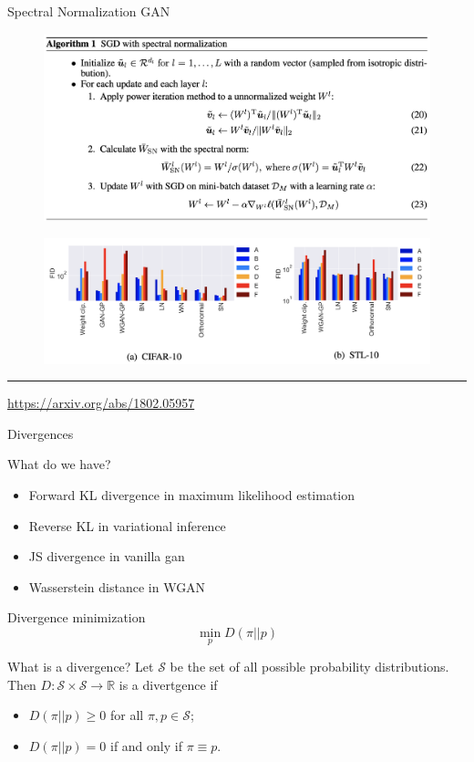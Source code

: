 \documentclass{beamer}
\newcommand{\bbR}{\mathbb{R}}
\newcommand{\cS}{\mathcal{S}}
\begin{document}
\begin{frame}{Spectral Normalization GAN}
	\begin{figure}
		\centering
		\includegraphics[width=0.85\linewidth]{figs/sngan_pseudocode}
	\end{figure}
	\begin{figure}
		\centering
		\includegraphics[width=0.85\linewidth]{figs/sngan_fids}
	\end{figure}
	\vfill
	\hrule\medskip 
	{\scriptsize \href{https://arxiv.org/abs/1802.05957}{https://arxiv.org/abs/1802.05957}}
\end{frame}
\begin{frame}{Divergences}
	\begin{block}{What do we have?}
		\begin{itemize}
			\item Forward KL divergence in maximum likelihood estimation
			\item Reverse KL in variational inference
			\item JS divergence in  vanilla gan
			\item Wasserstein distance in WGAN
		\end{itemize}
	\end{block}
	\begin{block}{Divergence minimization}
		\vspace{-0.3cm}
		\[
			\min_p D(\pi || p)
		\]
		\vspace{-0.5cm}
	\end{block}
	\begin{block}{What is a divergence?}
		Let $\cS$ be the set of all possible probability distributions. Then $D: \cS \times \cS \rightarrow \bbR$ is a divertgence if 
		\begin{itemize}
			\item $D(\pi || p) \geq 0$ for all $\pi, p \in \cS$;
			\item $D(\pi || p) = 0$ if and only if $\pi \equiv p$.
		\end{itemize}
	\end{block}
\end{frame}
\end{document}
